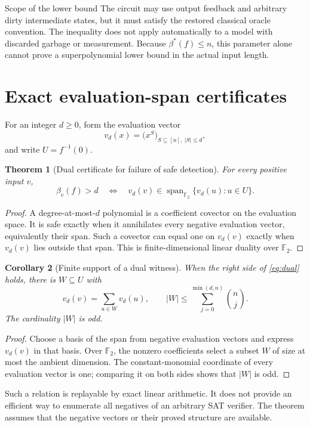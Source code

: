 \documentclass[11pt,letterpaper,oneside]{report}
\theoremstyle{komorebi}
\newtheorem{theorem}{Theorem}[chapter]
\newtheorem{corollary}[theorem]{Corollary}
\newcommand{\F}{\mathbb F_2}
\newcommand{\Span}{\operatorname{span}}
\begin{document}
\begin{scopebox}{Scope of the lower bound}
The circuit may use output feedback and arbitrary dirty intermediate states, but it must satisfy the restored classical oracle convention. The inequality does not apply automatically to a model with discarded garbage or measurement. Because $\beta^*(f)\le n$, this parameter alone cannot prove a superpolynomial lower bound in the actual input length.
\end{scopebox}

\section{Exact evaluation-span certificates}
For an integer $d\ge0$, form the evaluation vector
\[
 v_d(x)=\bigl(x^S\bigr)_{S\subseteq[n],\ |S|\le d},
\]
and write $U=f^{-1}(0)$.

\begin{theorem}[Dual certificate for failure of safe detection]\label{thm:dual}
For every positive input $v$,
\begin{equation}\label{eq:dual}
 \beta_v(f)>d
 \quad\Longleftrightarrow\quad
 v_d(v)\in\Span_{\F}\{v_d(u):u\in U\}.
\end{equation}
\end{theorem}
\begin{proof}
A degree-at-most-$d$ polynomial is a coefficient covector on the evaluation space. It is safe exactly when it annihilates every negative evaluation vector, equivalently their span. Such a covector can equal one on $v_d(v)$ exactly when $v_d(v)$ lies outside that span. This is finite-dimensional linear duality over $\F$.
\end{proof}

\begin{corollary}[Finite support of a dual witness]\label{cor:dual-witness}
When the right side of \eqref{eq:dual} holds, there is $W\subseteq U$ with
\[
 v_d(v)=\sum_{u\in W}v_d(u),\qquad
 |W|\le\sum_{j=0}^{\min(d,n)}\binom nj.
\]
The cardinality $|W|$ is odd.
\end{corollary}
\begin{proof}
Choose a basis of the span from negative evaluation vectors and express $v_d(v)$ in that basis. Over $\F$, the nonzero coefficients select a subset $W$ of size at most the ambient dimension. The constant-monomial coordinate of every evaluation vector is one; comparing it on both sides shows that $|W|$ is odd.
\end{proof}
Such a relation is replayable by exact linear arithmetic. It does not provide an efficient way to enumerate all negatives of an arbitrary SAT verifier. The theorem assumes that the negative vectors or their proved structure are available.
\end{document}
